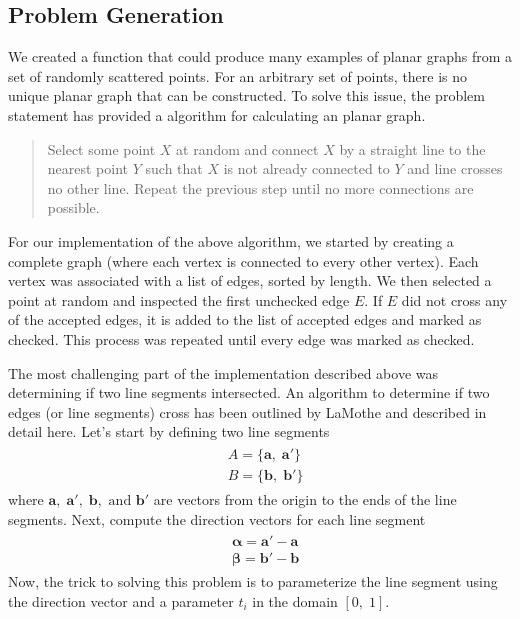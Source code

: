 \documentclass{article}
\newcommand{\ve}[1]{\boldsymbol{\mathbf{#1}}}
\begin{document}
	\subsection{Problem Generation}
		We created a function that could produce many examples of planar graphs from a set of randomly scattered points. For an arbitrary set of points, there is no unique planar graph that can be constructed. To solve this issue, the problem statement has provided a algorithm for calculating an planar graph. 
		\begin{quote}
		Select some point $X$ at random and connect $X$ by a straight line
		to the nearest point $Y$ such that $X$ is not already connected to $Y$ and line crosses no other line. Repeat the
		previous step until no more connections are possible.
		\end{quote}
		For our implementation of the above algorithm, we started by creating a complete graph (where each vertex is connected to every other vertex). Each vertex was associated with a list of edges, sorted by length. 
		We then selected a point at random and inspected the first unchecked edge $E$. If $E$ did not cross any of the accepted edges, it is added to the list of accepted edges and marked as checked. This process was repeated until every edge was marked as checked. \par
		The most challenging part of the implementation described above was determining if two line segments intersected. An algorithm to determine if two edges (or line segments) cross has been outlined by LaMothe \cite{tricks} and described in detail here. Let's start by defining two line segments 
		\begin{align}
			\begin{split}
				& A = \{ \ve{a},\; \ve{a'} \} \\
				& B = \{\ve{b}, \;\ve{b'}\}
			\end{split}
		\end{align}
		where $\ve{a}, \; \ve{a'}, \; \ve{b}, \text{ and } \ve{b'}$ are vectors from the origin to the ends of the line segments. Next, compute the direction vectors for each line segment
		\begin{align}
			\begin{split}
				&\ve{\alpha} = \ve{a}' - \ve{a} \\
				&\ve{\beta} = \ve{b}' - \ve{b} 
			\end{split}
		\end{align}
		Now, the trick to solving this problem is to parameterize the line segment using the direction vector and a parameter $t_i$ in the domain $[0, \; 1]$.
\end{document}
